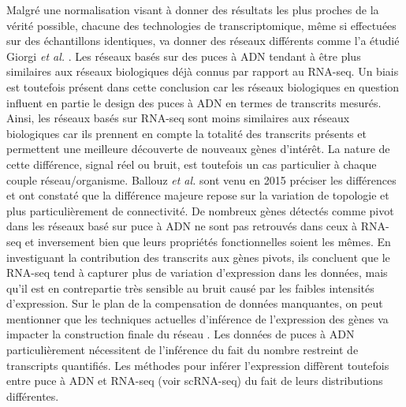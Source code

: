 Malgré une normalisation visant à donner des résultats les plus proches de la vérité possible, chacune des technologies de transcriptomique, même si effectuées sur des échantillons identiques, va donner des réseaux différents comme l'a étudié Giorgi \textit{et al.} \cite{Giorgi2013Mar}. Les réseaux basés sur des puces à \acrshort{ADN} tendant à être plus similaires aux réseaux biologiques déjà connus par rapport au \acrshort{RNA-seq}. Un biais est toutefois présent dans cette conclusion car les réseaux biologiques en question influent en partie le design des puces à \acrshort{ADN} en termes de transcrits mesurés. Ainsi, les réseaux basés sur \acrshort{RNA-seq} sont moins similaires aux réseaux biologiques car ils prennent en compte la totalité des transcrits présents et permettent une meilleure découverte de nouveaux gènes d'intérêt. La nature de cette différence, signal réel ou bruit, est toutefois un cas particulier à chaque couple réseau/\gls{organisme}. Ballouz \textit{et al.} sont venu en 2015 \cite{Ballouz2015} préciser les différences et ont constaté que la différence majeure repose sur la variation de topologie et plus particulièrement de connectivité. De nombreux gènes détectés comme pivot dans les réseaux basé sur puce à \acrshort{ADN} ne sont pas retrouvés dans ceux à \acrshort{RNA-seq} et inversement bien que leurs propriétés fonctionnelles soient les mêmes. En investiguant la contribution des transcrits aux gènes pivots, ils concluent que le \acrshort{RNA-seq} tend à capturer plus de variation d'expression dans les données, mais qu'il est en contrepartie très sensible au bruit causé par les faibles intensités d'expression. Sur le plan de la compensation de données manquantes, on peut mentionner que les techniques actuelles d'inférence de l'expression des gènes va impacter la construction finale du réseau \cite{Chowdhury2019}. Les données de puces à \acrshort{ADN} particulièrement nécessitent de l'inférence du fait du nombre restreint de transcripts quantifiés. Les méthodes pour inférer l'expression diffèrent toutefois entre puce à \acrshort{ADN} et \acrshort{RNA-seq} (voir scRNA-seq) du fait de leurs distributions différentes.

